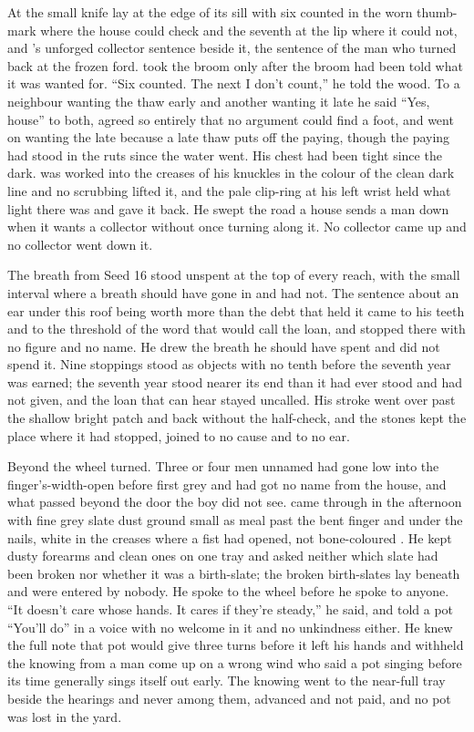 At  the small knife lay at the edge of its sill with six counted in the worn thumb-mark where the house could check and the seventh at the lip where it could not, and 's unforged collector sentence beside it, the sentence of the man who turned back at the frozen ford.  took the broom only after the broom had been told what it was wanted for. “Six counted. The next I don't count,” he told the wood. To a neighbour wanting the thaw early and another wanting it late he said “Yes, house” to both, agreed so entirely that no argument could find a foot, and went on wanting the late because a late thaw puts off the paying, though the paying had stood in the ruts since the water went. His chest had been tight since the dark.  was worked into the creases of his knuckles in the colour of the clean dark line and no scrubbing lifted it, and the pale clip-ring at his left wrist held what light there was and gave it back. He swept the road a house sends a man down when it wants a collector without once turning along it. No collector came up  and no collector went down it.

The breath from Seed 16 stood unspent at the top of every reach, with the small interval where a breath should have gone in and had not. The sentence about an ear under this roof being worth more than the debt that held it came to his teeth and to the threshold of the word that would call the loan, and stopped there with no figure and no name. He drew the breath he should have spent and did not spend it. Nine stoppings stood as objects with no tenth before the seventh year was earned; the seventh year stood nearer its end than it had ever stood and had not given, and the loan that can hear stayed uncalled. His stroke went over  past the shallow bright patch and back without the half-check, and the stones kept the place where it had stopped, joined to no cause and to no ear.

Beyond  the wheel turned. Three or four men unnamed had gone low into the finger's-width-open  before first grey and had got no name from the house, and what passed beyond the door the boy did not see.  came through in the afternoon with fine grey slate dust ground small as meal past the bent finger and under the nails, white in the creases where a fist had opened, not bone-coloured . He kept dusty forearms and clean ones on one tray and asked neither which slate had been broken nor whether it was a birth-slate; the broken birth-slates lay beneath  and were entered by nobody. He spoke to the wheel before he spoke to anyone. “It doesn't care whose hands. It cares if they're steady,” he said, and told a pot “You'll do” in a voice with no welcome in it and no unkindness either. He knew the full note that pot would give three turns before it left his hands and withheld the knowing from a man come up on a wrong wind who said a pot singing before its time generally sings itself out early. The knowing went to the near-full tray beside the hearings and never among them, advanced and not paid, and no pot was lost in the yard.

